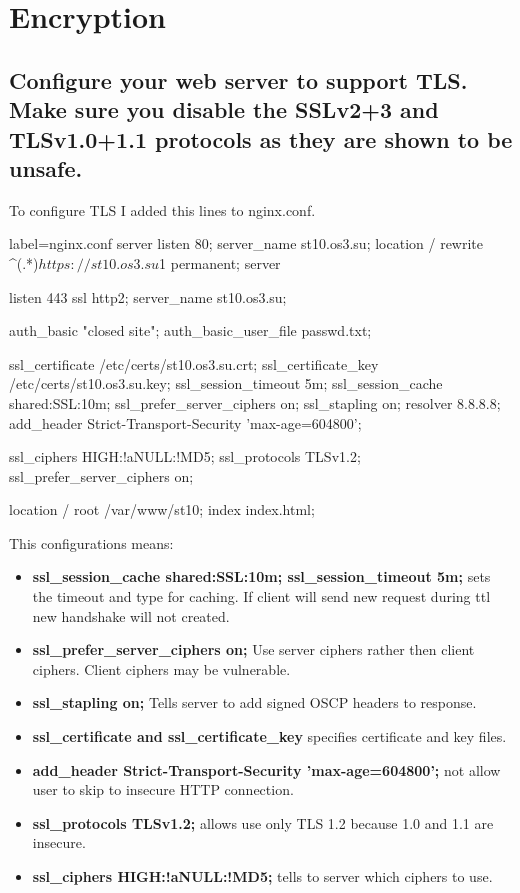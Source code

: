 \documentclass[a4paper,11pt]{article}
\begin{document}
\section{Encryption}
\addtocounter{subsection}{5}
\subsection{Configure your web server to support TLS. Make sure you disable the SSLv2+3 and TLSv1.0+1.1 protocols as they are shown to be unsafe.}
To configure TLS I added this lines to nginx.conf.

\begin{nginxcode*}{label=nginx.conf}
server {
    listen  80;
    server_name     st10.os3.su;
    location        / {
            rewrite ^(.*)$ https://st10.os3.su$1 permanent;
    }
}
    server {
    listen       443 ssl http2;
    server_name  st10.os3.su;

    auth_basic           "closed site";
    auth_basic_user_file passwd.txt;

    ssl_certificate       /etc/certs/st10.os3.su.crt;
    ssl_certificate_key   /etc/certs/st10.os3.su.key;
    ssl_session_timeout  5m;
    ssl_session_cache   shared:SSL:10m;
    ssl_prefer_server_ciphers on;
    ssl_stapling on;
    resolver 8.8.8.8;
    add_header Strict-Transport-Security 'max-age=604800';

    ssl_ciphers  HIGH:!aNULL:!MD5;
    ssl_protocols TLSv1.2;
    ssl_prefer_server_ciphers  on;

    location / {
        root   /var/www/st10;
        index  index.html;
    }
}
\end{nginxcode*}
This configurations means:
\begin{itemize}
  \item \textbf{ssl\_session\_cache shared:SSL:10m; ssl\_session\_timeout 5m;} sets the timeout and type for caching. If client will send new request during ttl new handshake will not created.
  \item \textbf{ssl\_prefer\_server\_ciphers on;} Use server ciphers rather then client ciphers. Client ciphers may be vulnerable.
  \item \textbf{ssl\_stapling on;} Tells server to add signed OSCP headers to response.
  \item \textbf{ssl\_certificate and ssl\_certificate\_key} specifies certificate and key files.
  \item \textbf{add\_header Strict-Transport-Security 'max-age=604800';} not allow user to skip to insecure HTTP connection.
  \item \textbf{ssl\_protocols TLSv1.2;} allows use only TLS 1.2 because 1.0 and 1.1 are insecure.
  \item \textbf{ssl\_ciphers  HIGH:!aNULL:!MD5;} tells to server which ciphers to use.
\end{itemize}
\end{document}
